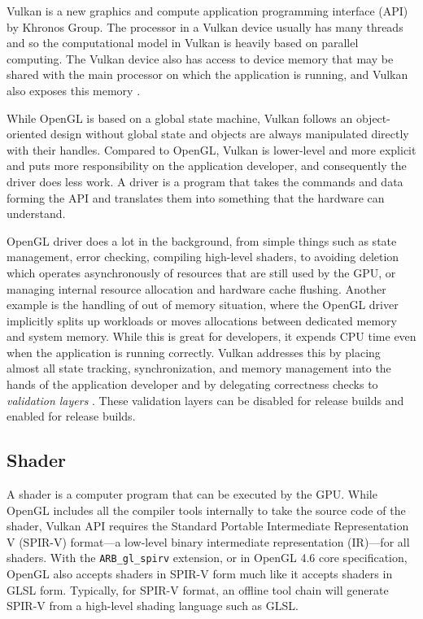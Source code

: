 \documentclass[a4paper, 12pt, oneside]{book}
\begin{document}
\begin{doublespace}
    Vulkan is a new graphics and compute application programming interface (API) by Khronos Group. The processor in a Vulkan device usually has many threads and so the computational model in Vulkan is heavily based on parallel computing. The Vulkan device also has access to device memory that may be shared with the main processor on which the application is running, and Vulkan also exposes this memory \cite{sellers2016}.
    
    While OpenGL is based on a global state machine, Vulkan follows an object-oriented design without global state and objects are always manipulated directly with their handles. Compared to OpenGL, Vulkan is lower-level and more explicit and puts more responsibility on the application developer, and consequently the driver does less work. A driver is a program that takes the commands and data forming the API and translates them into something that the hardware can understand.
    
    OpenGL driver does a lot in the background, from simple things such as state management, error checking, compiling high-level shaders, to avoiding deletion which operates asynchronously of resources that are still used by the GPU, or managing internal resource allocation and hardware cache flushing. Another example is the handling of out of memory situation, where the OpenGL driver implicitly splits up workloads or moves allocations between dedicated memory and system memory. While this is great for developers, it expends CPU time even when the application is running correctly. Vulkan addresses this by placing almost all state tracking, synchronization, and memory management into the hands of the application developer and by delegating correctness checks to \textit{validation layers} \cite{sellers2016}. These validation layers can be disabled for release builds and enabled for release builds.
\end{doublespace}

\subsection{Shader}

\begin{doublespace}
    A shader is a computer program that can be executed by the GPU. While OpenGL includes all the compiler tools internally to take the source code of the shader, Vulkan API requires the Standard Portable Intermediate Representation V (SPIR-V) format---a low-level binary intermediate representation (IR)---for all shaders. With the \texttt{ARB_gl_spirv} extension, or in OpenGL 4.6 core specification, OpenGL also accepts shaders in SPIR-V form much like it accepts shaders in GLSL form. Typically, for SPIR-V format, an offline tool chain will generate SPIR-V from a high-level shading language such as GLSL.
\end{doublespace}
\end{document}
